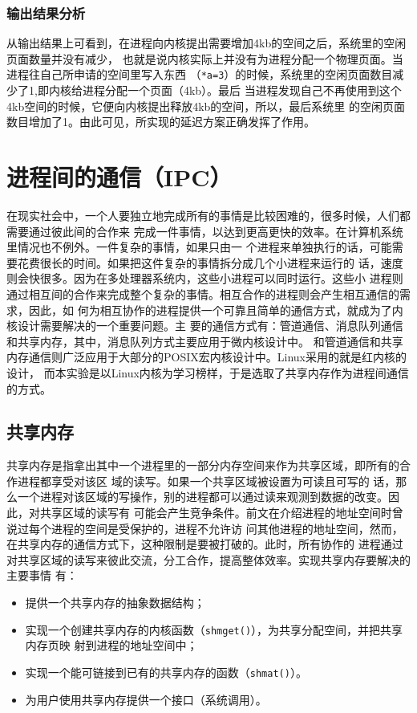 \documentclass{swfcthesismscctex}
\begin{document}
\subsubsection{输出结果分析}

从输出结果上可看到，在进程向内核提出需要增加4kb的空间之后，系统里的空闲页面数量并没有减少，
也就是说内核实际上并没有为进程分配一个物理页面。当进程往自己所申请的空间里写入东西
（\texttt{*a=3}）的时候，系统里的空闲页面数目减少了1,即内核给进程分配一个页面（4kb）。最后
当进程发现自己不再使用到这个4kb空间的时候，它便向内核提出释放4kb的空间，所以，最后系统里
的空闲页面数目增加了1。由此可见，所实现的延迟方案正确发挥了作用。

\section{进程间的通信（IPC）}

在现实社会中，一个人要独立地完成所有的事情是比较困难的，很多时候，人们都需要通过彼此间的合作来
完成一件事情，以达到更高更快的效率。在计算机系统里情况也不例外。一件复杂的事情，如果只由一
个进程来单独执行的话，可能需要花费很长的时间。如果把这件复杂的事情拆分成几个小进程来运行的
话，速度则会快很多。因为在多处理器系统内，这些小进程可以同时运行。这些小
进程则通过相互间的合作来完成整个复杂的事情。相互合作的进程则会产生相互通信的需求，因此，如
何为相互协作的进程提供一个可靠且简单的通信方式，就成为了内核设计需要解决的一个重要问题。主
要的通信方式有：管道通信、消息队列通信和共享内存，其中，消息队列方式主要应用于微内核设计中。
和管道通信和共享内存通信则广泛应用于大部分的POSIX宏内核设计中。Linux采用的就是红内核的设计，
而本实验是以Linux内核为学习榜样，于是选取了共享内存作为进程间通信的方式。

\subsection{共享内存}

共享内存是指拿出其中一个进程里的一部分内存空间来作为共享区域，即所有的合作进程都享受对该区
域的读写。如果一个共享区域被设置为可读且可写的
话，那么一个进程对该区域的写操作，别的进程都可以通过读来观测到数据的改变。因此，对共享区域的读写有
可能会产生竞争条件。前文在介绍进程的地址空间时曾说过每个进程的空间是受保护的，进程不允许访
问其他进程的地址空间，然而，在共享内存的通信方式下，这种限制是要被打破的。此时，所有协作的
进程通过对共享区域的读写来彼此交流，分工合作，提高整体效率。实现共享内存要解决的主要事情
有：
\begin{itemize}
\item 提供一个共享内存的抽象数据结构；
\item 实现一个创建共享内存的内核函数（\texttt{shmget()}），为共享分配空间，并把共享内存页映
  射到进程的地址空间中；
\item 实现一个能可链接到已有的共享内存的函数（\texttt{shmat()}）。
\item 为用户使用共享内存提供一个接口（系统调用）。
\end{itemize}
\end{document}
